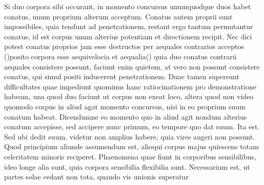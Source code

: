Si duo corpora sibi occurant, in momento concursus\protect{} unumquodque duos
habet conatus, unum proprium\protect{} alterum acceptum\protect{}. Conatus autem proprii sunt impossibiles,
quia tendunt ad penetrationem, restant ergo tantum
%
%
permutantur conatus, id est corpus unum alterius potentiam\protect{} 
et directionem recipit. Nec dici potest conatus proprios\protect{} jam esse
destructos per aequales contrarios acceptos\protect{} (\phantom)\hspace*{-1.2mm}posito corpora esse aequivelocia 
et aequalia\phantom(\hspace*{-1.2mm}) quia duo conatus contrarii aequales\protect{} consistere possunt, faciunt enim 
quietem, at vero non possunt consistere conatus, qui simul positi inducerent 
penetrationem. Duae tamen supersunt difficultates quae impediunt 
quominus hanc ratiocinationem pro demonstratione habeam, una quod duo 
%
faciunt ut corpus
%
non exeat loco,
altera quod non video quomodo corpus in aliud agat momento concursus\protect{}, nisi in eo proprium
suum conatum habeat. Dicendumne eo momento quo in aliud agit nondum alterius conatum
accepisse, sed accipere nunc primum, eo tempore quo dat suum. Ita est. Sed ubi dedit suum,
videtur non amplius habere, quia vires\protect{} augeri non possunt. Quod principium aliunde assumendum
est, alioqui corpus majus quiescens totam celeritatem minoris reciperet.
\pend\pstart
Phaenomena\protect{} quae fiunt in corporibus sensibilibus\protect{}, ideo longe alia sunt, quia corpora 
sensibilia\protect{} 
%
%
flexibilia sunt.  
\pend\pstart
Necessarium est, ut partes solae cedant non tota, quando vis unionis\protect{} superatur 
